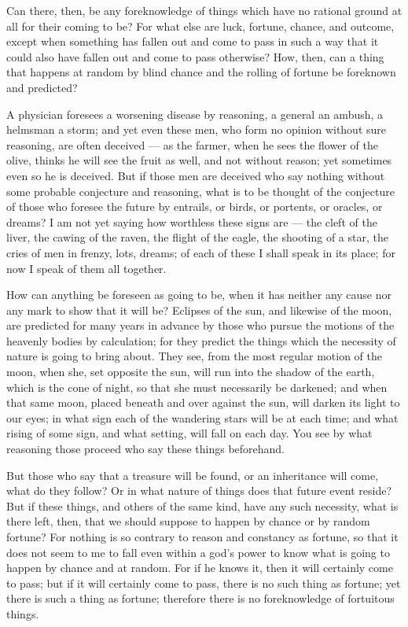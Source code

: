  Can there, then, be any foreknowledge of things which have no rational ground at all for their coming to be? For what else are luck, fortune, chance, and outcome, except when something has fallen out and come to pass in such a way that it could also have fallen out and come to pass otherwise? How, then, can a thing that happens at random by blind chance and the rolling of fortune be foreknown and predicted?

 A physician foresees a worsening disease by reasoning, a general an ambush, a helmsman a storm; and yet even these men, who form no opinion without sure reasoning, are often deceived — as the farmer, when he sees the flower of the olive, thinks he will see the fruit as well, and not without reason; yet sometimes even so he is deceived. But if those men are deceived who say nothing without some probable conjecture and reasoning, what is to be thought of the conjecture of those who foresee the future by entrails, or birds, or portents, or oracles, or dreams? I am not yet saying how worthless these signs are — the cleft of the liver, the cawing of the raven, the flight of the eagle, the shooting of a star, the cries of men in frenzy, lots, dreams; of each of these I shall speak in its place; for now I speak of them all together.

 How can anything be foreseen as going to be, when it has neither any cause nor any mark to show that it will be? Eclipses of the sun, and likewise of the moon, are predicted for many years in advance by those who pursue the motions of the heavenly bodies by calculation; for they predict the things which the necessity of nature is going to bring about. They see, from the most regular motion of the moon, when she, set opposite the sun, will run into the shadow of the earth, which is the cone of night, so that she must necessarily be darkened; and when that same moon, placed beneath and over against the sun, will darken its light to our eyes; in what sign each of the wandering stars will be at each time; and what rising of some sign, and what setting, will fall on each day. You see by what reasoning those proceed who say these things beforehand.

 But those who say that a treasure will be found, or an inheritance will come, what do they follow? Or in what nature of things does that future event reside? But if these things, and others of the same kind, have any such necessity, what is there left, then, that we should suppose to happen by chance or by random fortune? For nothing is so contrary to reason and constancy as fortune, so that it does not seem to me to fall even within a god's power to know what is going to happen by chance and at random. For if he knows it, then it will certainly come to pass; but if it will certainly come to pass, there is no such thing as fortune; yet there is such a thing as fortune; therefore there is no foreknowledge of fortuitous things.

